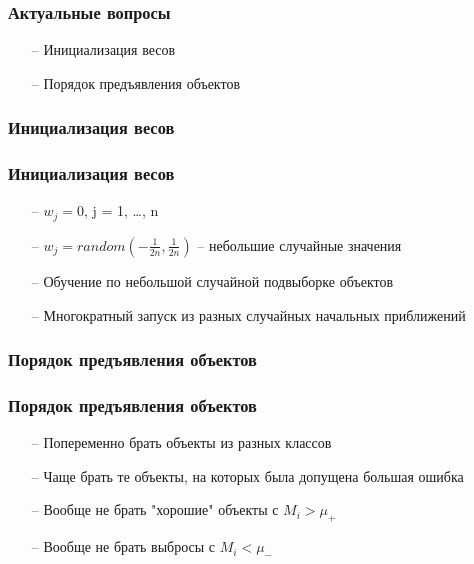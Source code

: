 \documentclass[12pt]{beamer}
\begin{document}
\begin{frame}\frametitle{Актуальные вопросы}
\begin{itemize}
\item[--] Инициализация весов
\item[--] Порядок предъявления объектов
\end{itemize}
\end{frame}

\begin{frame}\frametitle{Инициализация весов}

\end{frame}

\begin{frame}\frametitle{Инициализация весов}
\begin{itemize}
\item[--] $w_j = 0$, j = 1, \dots, n
\item[--] $w_j = random(-\frac{1}{2n}, \frac{1}{2n})$ -- небольшие случайные значения
\item[--] Обучение по небольшой случайной подвыборке объектов
\item[--] Многократный запуск из разных случайных начальных приближений
\end{itemize}

\end{frame}

\begin{frame}\frametitle{Порядок предъявления объектов}

\end{frame}

\begin{frame}\frametitle{Порядок предъявления объектов}
\begin{itemize}
\item[--] Попеременно брать объекты из разных классов
\item[--] Чаще брать те объекты, на которых была допущена большая ошибка
\item[--] Вообще не брать "хорошие" объекты с $M_i > \mu_+$
\item[--] Вообще не брать выбросы с $M_i < \mu_-$
\end{itemize}
\end{frame}
\end{document}
